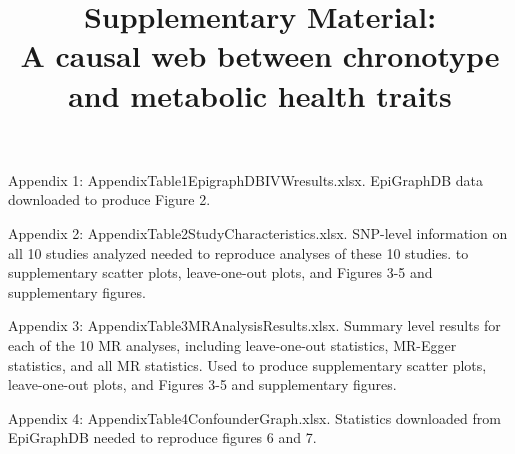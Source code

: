 \documentclass{article}
\title{{\bf Supplementary Material:} \\A causal web between chronotype and metabolic health traits}
\author{}
\date{}
\begin{document}
\maketitle

Appendix 1: AppendixTable1EpigraphDBIVWresults.xlsx. EpiGraphDB data downloaded to produce Figure 2.

Appendix 2: AppendixTable2StudyCharacteristics.xlsx.
SNP-level information on all 10 studies analyzed needed to reproduce analyses of these 10 studies. to supplementary scatter plots, leave-one-out plots, and Figures 3-5 and supplementary figures.

Appendix 3: AppendixTable3MRAnalysisResults.xlsx. Summary level results for each of the 10 MR analyses, including leave-one-out statistics, MR-Egger statistics, and all MR statistics. Used to produce supplementary scatter plots, leave-one-out plots, and Figures 3-5 and supplementary figures. 

Appendix 4: AppendixTable4ConfounderGraph.xlsx.
Statistics downloaded from EpiGraphDB needed to reproduce figures 6 and 7.
\end{document}
